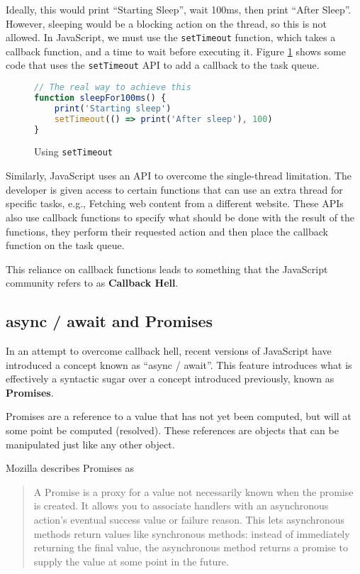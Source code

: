 Ideally, this would print ``Starting Sleep'', wait 100ms, then print ``After Sleep''. However, sleeping would be a blocking action on the thread, so this is not allowed. In JavaScript, we must use the \texttt{setTimeout} function, which takes a callback function, and a time to wait before executing it. Figure \ref{setTimeoutCode} shows some code that uses the \texttt{setTimeout} API to add a callback to the task queue.

\begin{figure}
    \caption{Using \texttt{setTimeout}}
    \label{setTimeoutCode}
    \begin{lstlisting}[language=javascript]
// The real way to achieve this
function sleepFor100ms() {
    print('Starting sleep')
    setTimeout(() => print('After sleep'), 100)
}
    \end{lstlisting}
\end{figure}

Similarly, JavaScript uses an API to overcome the single-thread limitation. The developer is given access to certain functions that can use an extra thread for specific tasks, e.g., Fetching web content from a different website. These APIs also use callback functions to specify what should be done with the result of the functions, they perform their requested action and then place the callback function on the task queue.

This reliance on callback functions leads to something that the JavaScript community refers to as \textbf{Callback Hell}\cite{callbackhell}.

\subsection{async / await and Promises}\label{background:asyncawait}

In an attempt to overcome callback hell, recent versions of JavaScript have introduced a concept known as ``async / await''.\cite{es8spec} This feature introduces what is effectively a syntactic sugar over a concept introduced previously, known as \textbf{Promises}.

Promises are a reference to a value that has not yet been computed, but will at some point be computed (resolved). These references are objects that can be manipulated just like any other object.

Mozilla describes Promises as
\begin{quote}
A Promise is a proxy for a value not necessarily known when the promise is created. It allows you to associate handlers with an asynchronous action's eventual success value or failure reason. This lets asynchronous methods return values like synchronous methods: instead of immediately returning the final value, the asynchronous method returns a promise to supply the value at some point in the future.
    \cite{mozillapromises}
\end{quote}

